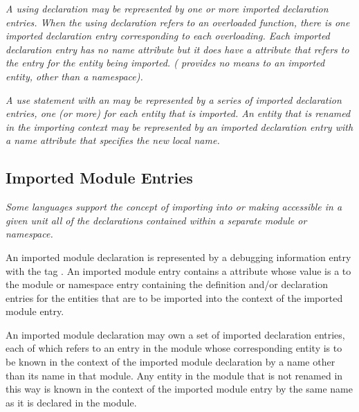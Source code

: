 \textit{A  using declaration may be represented 
by one or more
\hypertarget{chap:DWATimportnamespaceusingdeclaration}{}
imported 
declaration entries.  When the using declaration
refers to an overloaded function, there is one imported
declaration entry corresponding to each overloading. Each
imported declaration entry has no name attribute but it does
have a \DWATimportDEFN{} attribute that refers to the entry for the
entity being imported. ( 
provides no means to 
an imported entity, other than a namespace).}


\textit{A  use statement 
with an  may be
represented by a series of imported declaration entries,
one (or more) for each entity that is imported. An entity
that is renamed in the importing context may be represented
by an imported declaration entry with a name attribute that
specifies the new local name.
}

\subsection{Imported Module Entries}
\label{chap:importedmoduleentries}

\textit{Some languages support the concept of importing into or making
accessible in a given unit all of the declarations contained
within a separate module or namespace.
}

An imported module declaration is represented by a debugging
information entry with 
the 
tag \DWTAGimportedmoduleTARG.
An
imported module entry contains a 
\DWATimport{} attribute
whose value is a  
to the module or namespace entry
containing the definition and/or declaration entries for
the entities that are to be imported into the context of the
imported module entry.

An imported module declaration may own a set of imported
declaration entries, each of which refers to an entry in the
module whose corresponding entity is to be known in the context
of the imported module declaration by a name other than its
name in that module. Any entity in the module that is not
renamed in this way is known in the context of the imported
module entry by the same name as it is declared in the module.

